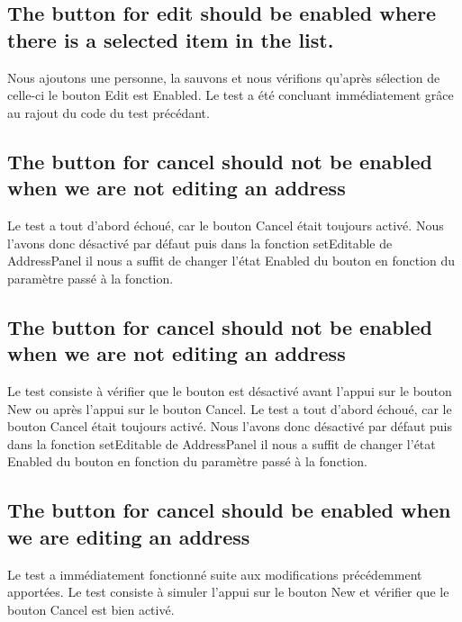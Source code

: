 \documentclass[a4paper,oneside,frenchb,12pt]{article}
\begin{document}
\subsection{The button for edit should be enabled where there is a selected item in the list.}
Nous ajoutons une personne, la sauvons et nous vérifions qu'après sélection 
de celle-ci le bouton Edit est Enabled. Le test a été concluant immédiatement 
grâce au rajout du code du test précédant.

\subsection{The button for cancel should not be enabled when we are not editing an address}
Le test a tout d'abord échoué, car le bouton Cancel était toujours activé. 
Nous l'avons donc désactivé par défaut puis dans la fonction setEditable de 
AddressPanel il nous a suffit de changer l'état Enabled du bouton en fonction 
du paramètre passé à la fonction.

\subsection{The button for cancel should not be enabled when we are not editing an address}
Le test consiste à vérifier que le bouton est désactivé avant l'appui sur le 
bouton New ou après l'appui sur le bouton Cancel.
Le test a tout d'abord échoué, car le bouton Cancel était toujours activé. 
Nous l'avons donc désactivé par défaut puis dans la fonction setEditable de 
AddressPanel il nous a suffit de changer l'état Enabled du bouton en fonction du 
paramètre passé à la fonction.

\subsection{The button for cancel should be enabled when we are editing an address}
Le test a immédiatement fonctionné suite aux modifications précédemment apportées.
Le test consiste à simuler l'appui sur le bouton New et vérifier que le 
bouton Cancel est bien activé.
\end{document}
